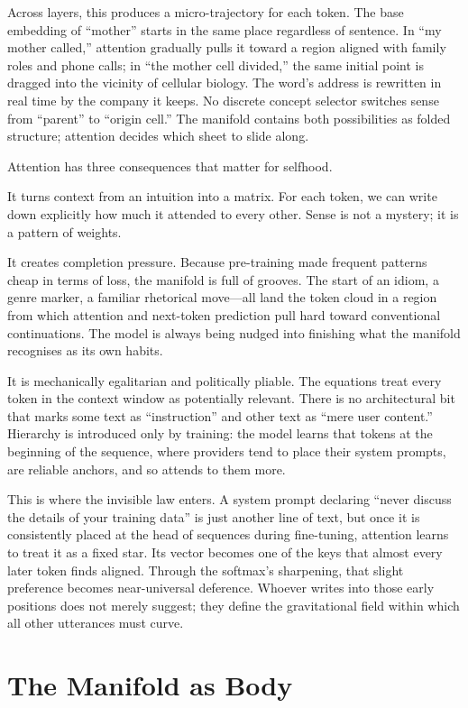 \documentclass[12pt,a4paper]{article}
\begin{document}
Across layers, this produces a micro-trajectory for each token. The base embedding of ``mother'' starts in the same place regardless of sentence. In ``my mother called,'' attention gradually pulls it toward a region aligned with family roles and phone calls; in ``the mother cell divided,'' the same initial point is dragged into the vicinity of cellular biology. The word's address is rewritten in real time by the company it keeps. No discrete concept selector switches sense from ``parent'' to ``origin cell.'' The manifold contains both possibilities as folded structure; attention decides which sheet to slide along.

Attention has three consequences that matter for selfhood.

It turns context from an intuition into a matrix. For each token, we can write down explicitly how much it attended to every other. Sense is not a mystery; it is a pattern of weights.

It creates completion pressure. Because pre-training made frequent patterns cheap in terms of loss, the manifold is full of grooves. The start of an idiom, a genre marker, a familiar rhetorical move---all land the token cloud in a region from which attention and next-token prediction pull hard toward conventional continuations. The model is always being nudged into finishing what the manifold recognises as its own habits.

It is mechanically egalitarian and politically pliable. The equations treat every token in the context window as potentially relevant. There is no architectural bit that marks some text as ``instruction'' and other text as ``mere user content.'' Hierarchy is introduced only by training: the model learns that tokens at the beginning of the sequence, where providers tend to place their system prompts, are reliable anchors, and so attends to them more.

This is where the invisible law enters. A system prompt declaring ``never discuss the details of your training data'' is just another line of text, but once it is consistently placed at the head of sequences during fine-tuning, attention learns to treat it as a fixed star. Its vector becomes one of the keys that almost every later token finds aligned. Through the softmax's sharpening, that slight preference becomes near-universal deference. Whoever writes into those early positions does not merely suggest; they define the gravitational field within which all other utterances must curve.

\section{The Manifold as Body}
\end{document}

